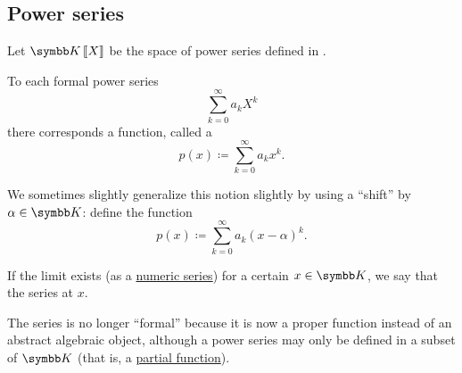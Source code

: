 \subsection{Power series}\label{subsec:power_series}

\begin{definition}\label{def:convergent_power_series}
  Let \( \BK\PowSeries{X} \) be the space of power series defined in .

  To each formal power series
  \begin{equation*}
    \sum_{k=0}^\infty a_k X^k
  \end{equation*}
  there corresponds a function, called a 
  \begin{equation}\label{def:convergent_power_series/series}
    p(x) \coloneqq \sum_{k=0}^\infty a_k x^k.
  \end{equation}

  We sometimes slightly generalize this notion slightly by using a \enquote{shift} by \( \alpha \in \BK \): define the function
  \begin{equation}\label{def:convergent_power_series/shifted_series}
    p(x) \coloneqq \sum_{k=0}^\infty a_k (x - \alpha)^k.
  \end{equation}

  If the limit exists (as a \hyperref[def:convergent_series]{numeric series}) for a certain \( x \in \BK \), we say that the series  at \( x \).

  The series is no longer \enquote{formal} because it is now a proper function instead of an abstract algebraic object, although a power series may only be defined in a subset of \( \BK \) (that is, a \hyperref[def:function/partial]{partial function}).
\end{definition}

